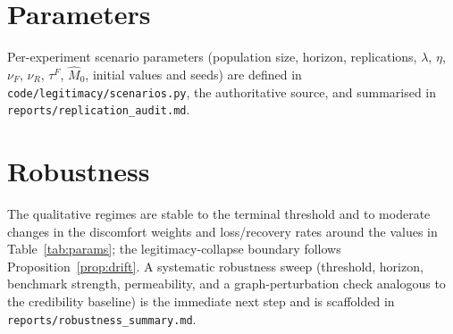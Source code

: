 \documentclass[11pt]{article}
\newcommand{\1}{\mathbf{1}}
\begin{document}
\section{Parameters}
\label{app:params}

Per-experiment scenario parameters (population size, horizon, replications,
$\lambda$, $\eta$, $\nu_F$, $\nu_R$, $\tau^F$, $\hat M_0$, initial values and
seeds) are defined in \texttt{code/legitimacy/scenarios.py}, the authoritative
source, and summarised in \texttt{reports/replication\_audit.md}.

\section{Robustness}
\label{app:robust}
The qualitative regimes are stable to the terminal threshold and to moderate
changes in the discomfort weights and loss/recovery rates around the values in
Table~\ref{tab:params}; the legitimacy-collapse boundary follows
Proposition~\ref{prop:drift}. A systematic robustness sweep (threshold, horizon,
benchmark strength, permeability, and a graph-perturbation check analogous to the
credibility baseline) is the immediate next step and is scaffolded in
\texttt{reports/robustness\_summary.md}.



\end{document}
